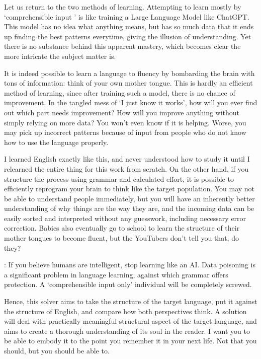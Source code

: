 Let us return to the two methods of learning. Attempting to learn mostly by `comprehensible input ' is like training a Large Language Model like ChatGPT. This model has no idea what anything means, but has so much data that it ends up finding the best patterns everytime, giving the illusion of understanding. Yet there is no substance behind this apparent mastery, which becomes clear the more intricate the subject matter is.

It is indeed possible to learn a language to fluency by bombarding the brain with tons of information: think of your own mother tongue.  This is hardly an efficient method of learning, since after training such a model, there is no chance of improvement. In the tangled mess of `I just know it works', how will you ever find out which part needs improvement? How will you improve anything without simply relying on more data? You won't even know if it is helping. Worse, you may pick up incorrect patterns because of input from people who do not know how to use the language properly. 

I learned English exactly like this, and never understood how to study it until I relearned the entire thing for this work from scratch. On the other hand, if you structure the process using grammar and calculated effort, it is possible to efficiently reprogram your brain to think like the target population. You may not be able to understand people immediately, but you will have an inherently better understanding of why things are the way they are, and the incoming data can be easily sorted and interpreted without any guesswork, including necessary error correction. Babies also eventually go to school to learn the structure of their mother tongues to become fluent, but the YouTubers don't tell you that, do they?

: If you believe humans are intelligent, stop learning like an AI. Data poisoning is a significant problem in language learning, against which grammar offers protection. A `comprehensible input only' individual will be completely screwed.

Hence, this solver aims to  take the structure of the target language, put it against the structure of English, and compare how both perspectives think. A solution will deal with  practically meaningful structural aspect of the target language, and aims to create a thorough understanding of its soul in the reader. I want you to be able to embody it to the point you remember it in your next life. Not that you should, but you should be able to.

